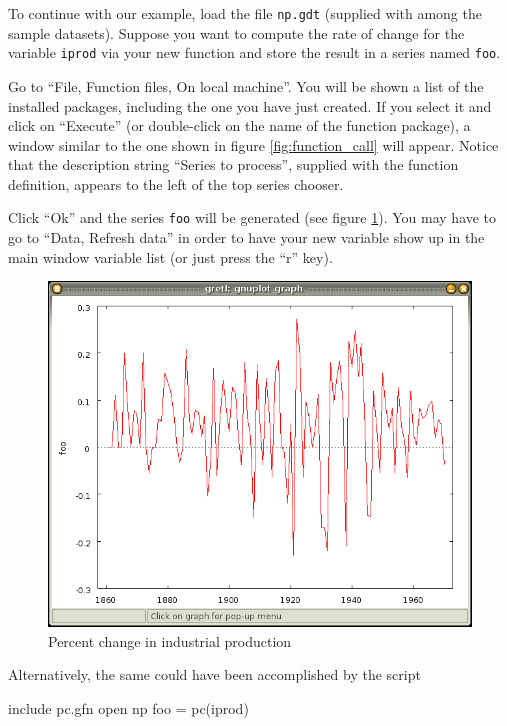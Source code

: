 To continue with our example, load the file \texttt{np.gdt} (supplied
with  among the sample datasets). Suppose you want to
compute the rate of change for the variable \texttt{iprod} via your
new function and store the result in a series named \texttt{foo}.

Go to ``File, Function files, On local machine''.  You will be shown a
list of the installed packages, including the one you have just
created. If you select it and click on ``Execute'' (or double-click on
the name of the function package), a window similar to the one shown
in figure \ref{fig:function_call} will appear.  Notice that the
description string ``Series to process'', supplied with the function
definition, appears to the left of the top series chooser.

Click ``Ok'' and the
series \texttt{foo} will be generated (see figure \ref{fig:iprod_pc}).
You may have to go to ``Data, Refresh data'' in order to have your new
variable show up in the main window variable list (or just press the
``r'' key).

\begin{figure}[htbp]
  \centering
  \includegraphics[scale=0.5]{figures/iprod_pc}
  \caption{Percent change in industrial production}
  \label{fig:iprod_pc}
\end{figure}

Alternatively, the same could have been accomplished by the script
\begin{code}
include pc.gfn
open np
foo = pc(iprod)
\end{code}


